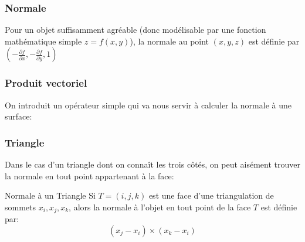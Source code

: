 \documentclass{beamercours}
\begin{document}
\begin{frame}
\frametitle{Normale}
\begin{remarque}{}{}
	Pour un objet suffisamment agréable (donc modélisable par une fonction mathématique simple $z = f(x, y)$), la normale au point $(x, y, z)$ est définie par $(-\frac{\partial{f}}{\partial{x}}, -\frac{\partial{f}}{\partial{y}}, 1)$
\end{remarque}
\end{frame}
\begin{frame}
\frametitle{Produit vectoriel}
On introduit un opérateur simple qui va nous servir à calculer la normale à une surface:

\end{frame}

\begin{frame}
\frametitle{Triangle}
Dans le cas d'un triangle dont on connaît les trois côtés, on peut aisément trouver la normale en tout point appartenant à la face:
\begin{propositionfr}{Normale à un Triangle}{}
	Si $T = (i, j, k)$ est une face d'une triangulation de sommets $x_{i}, x_{j}, x_{k}$, alors la normale à l'objet en tout point de la face $T$ est définie par:
	\begin{equation*}
		(x_{j} - x_{i}) \times (x_{k} - x_{i})
	\end{equation*}
\end{propositionfr}
\end{frame}
\end{document}
